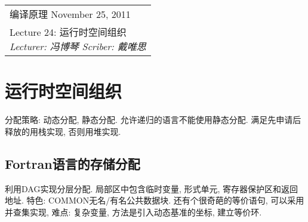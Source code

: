 \def\lecture{24}
\clearpage \noindent\begin{tabularx}{\linewidth}{|X|}
\hline \vskip -2mm
{\sf 编译原理} \hfill November 25, 2011 \\
{\centering \sf \large Lecture \lecture:
运行时空间组织 \\ }
\textsl{Lecturer: 冯博琴 \hfill Scriber: 戴唯思}\\ \hline
\end{tabularx}
\setcounter{section}{0}
\renewcommand{\thepage}{\lecture -\arabic{page}}

\section{运行时空间组织}

    分配策略: 动态分配, 静态分配. 允许递归的语言不能使用静态分配. 满足先申请后释放的用栈实现, 否则用堆实现.

    \subsection{Fortran语言的存储分配}

        利用DAG实现分层分配. 局部区中包含临时变量, 形式单元, 寄存器保护区和返回地址. 特色: COMMON无名/有名公共数据块. 还有个很奇葩的等价语句, 可以采用并查集实现, 难点: 复杂变量, 方法是引入动态基准的坐标, 建立等价环.

